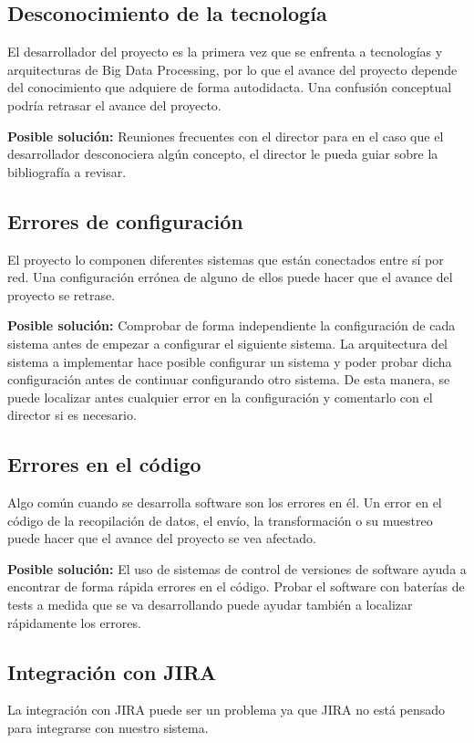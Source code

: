 \subsection{Desconocimiento de la tecnología}
El desarrollador del proyecto es la primera vez que se enfrenta a tecnologías y arquitecturas de Big Data Processing, por lo que el avance del proyecto depende del conocimiento que adquiere de forma autodidacta. Una confusión conceptual podría retrasar el avance del proyecto. 

\textbf{Posible solución:} Reuniones frecuentes con el director para en el caso que el desarrollador desconociera algún concepto, el director le pueda guiar sobre la bibliografía a revisar.

\subsection{Errores de configuración}
El proyecto lo componen diferentes sistemas que están conectados entre sí por red. Una configuración errónea de alguno de ellos puede hacer que el avance del proyecto se retrase.

\textbf{Posible solución:} Comprobar de forma independiente la configuración de cada sistema antes de empezar a configurar el siguiente sistema. La arquitectura del sistema a implementar hace posible configurar un sistema y poder probar dicha configuración antes de continuar configurando otro sistema. De esta manera, se puede localizar antes cualquier error en la configuración y comentarlo con el director si es necesario.

\subsection{Errores en el código}
Algo común cuando se desarrolla software son los errores en él. Un error en el código de la recopilación de datos, el envío, la transformación o su muestreo puede hacer que el avance del proyecto se vea afectado.

\textbf{Posible solución:} El uso de sistemas de control de versiones de software ayuda a encontrar de forma rápida errores en el código. Probar el software con baterías de tests a medida que se va desarrollando puede ayudar también a localizar rápidamente los errores.

\subsection{Integración con JIRA}
La integración con JIRA puede ser un problema ya que JIRA no está pensado para integrarse con nuestro sistema.

